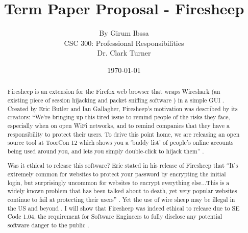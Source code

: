 \documentclass[12pt]{article}
\begin{document}
\title{\vfill Term Paper Proposal - Firesheep} %
\author{
By Girum Ibssa \vspace{10pt} \\
CSC 300: Professional Responsibilities  \vspace{10pt} \\
Dr. Clark Turner \vspace{10pt} \\
}
\date{\today} %

\maketitle

\vfill  %
\begin{abstract}
Firesheep is an extension for the Firefox web browser that wraps Wireshark (an existing piece of session hijacking and packet sniffing software \cite{wireshark}) in a simple GUI \cite{firesheep-source}. Created by Eric Butler and Ian Gallagher, Firesheep's motivation was described by its creators: ``We're bringing up this tired issue to remind people of the risks they face, especially when on open WiFi networks, and to remind companies that they have a responsibility to protect their users. To drive this point home, we are releasing an open source tool at ToorCon 12 which shows you a `buddy list' of people's online accounts being used around you, and lets you simply double-click to hijack them'' \cite{security-now}.

Was it ethical to release this software? Eric stated in his release of Firesheep that ``It's extremely common for websites to protect your password by encrypting the initial login, but surprisingly uncommon for websites to encrypt everything else...This is a widely known problem that has been talked about to death, yet very popular websites continue to fail at protecting their users'' \cite{eric-butler}. Yet the use of wire sheep may be illegal in the US and beyond \cite{illegal-to-use-firesheep}. I will show that Firesheep was indeed ethical to release due to SE Code 1.04, the requirement for Software Engineers to fully disclose any potential software danger to the public \cite{se-code}.

\end{abstract}
\thispagestyle{empty} %
\newpage
\end{document}
